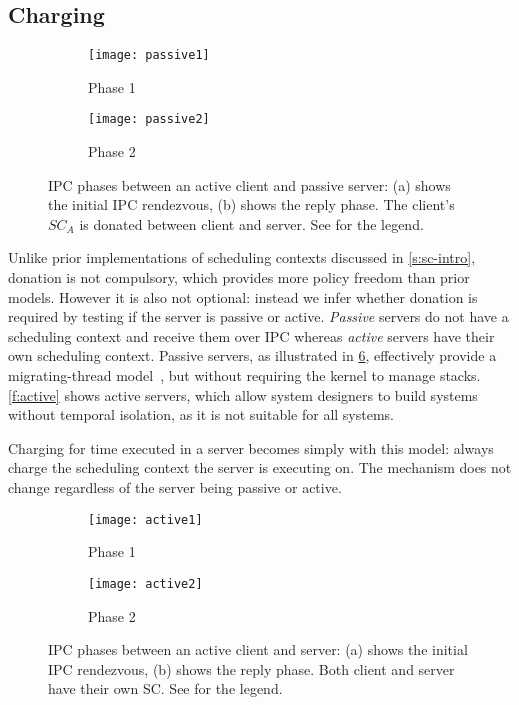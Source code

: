 \subsection{Charging}

\begin{figure}
    \centering
    \begin{subfigure}[h]{0.48\textwidth}
        \centering
        \texttt{[image: passive1]}
        \caption{Phase 1}
        \label{f:ipc1}
    \end{subfigure}%
    \begin{subfigure}[h]{0.48\textwidth}
        \centering
        \texttt{[image: passive2]}
        \caption{Phase 2}
        \label{f:ipc2}
    \end{subfigure}
    \label{f:passive}
    \caption{IPC phases between an active client and passive server: (a) shows the initial IPC rendezvous, (b) shows the
    reply phase. The client's $SC_{A}$ is donated between client and server. See  for the legend.}
\end{figure}


Unlike prior implementations of scheduling contexts discussed in \cref{s:sc-intro},
donation is not compulsory, which provides more policy freedom than prior models.
However it is also not optional: instead we infer whether donation is required by testing 
if the server is passive or active. \emph{Passive} servers do not have a scheduling context 
and receive them over \gls{IPC} whereas \emph{active} servers have their own scheduling context. 
Passive servers, as illustrated in \cref{f:passive}, effectively provide a migrating-thread
model~\citep{Ford_Lepreau_94, Gabber_SBBS_99}, but without requiring
the kernel to manage stacks. \cref{f:active} shows active servers, which allow system designers to
build systems without temporal isolation, as it is not suitable
for all systems.

Charging for time executed in a server becomes simply with this model: always charge the scheduling
context the server is executing on. The mechanism does not change regardless of the server being passive or
active. 

\begin{figure}
    \centering
    \begin{subfigure}[h]{0.48\textwidth}
        \centering
        \texttt{[image: active1]}
        \caption{Phase 1}
        \label{f:ipc1}
    \end{subfigure}%
    \begin{subfigure}[h]{0.48\textwidth}
        \centering
        \texttt{[image: active2]}
        \caption{Phase 2}
        \label{f:ipc2}
    \end{subfigure}
    \label{f:passive}
    \caption{IPC phases between an active client and server: (a) shows the initial IPC rendezvous, (b) shows the
    reply phase. Both client and server have their own SC. See  for the legend.}
\end{figure}

